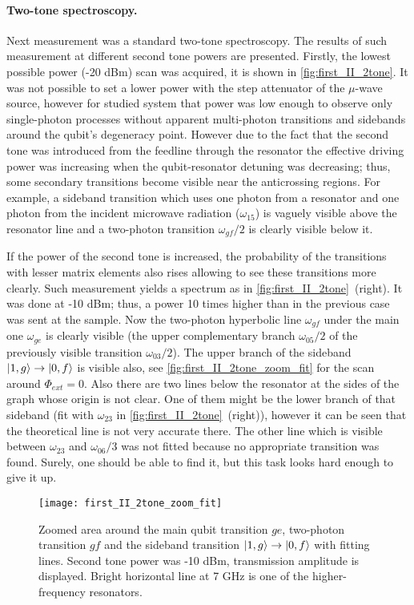 \documentclass[12pt, twoside]{report}
\DeclarePairedDelimiter\ket{\lvert}{\rangle}
\numberwithin{equation}{section}
\begin{document}
\paragraph{Two-tone spectroscopy.} Next measurement was a standard two-tone spectroscopy. The results of such measurement at different second tone powers are presented. Firstly, the lowest possible power (-20 dBm) scan was acquired, it is shown in \autoref{fig:first_II_2tone}. It was not possible to set a lower power with the step attenuator of the $\mu$-wave source, however for studied system that power was low enough to observe only single-photon processes without apparent multi-photon transitions and sidebands around the qubit's degeneracy point. However due to the fact that the second tone was introduced from the feedline through the resonator the effective driving power was increasing when the qubit-resonator detuning was decreasing; thus, some secondary transitions become visible near the anticrossing regions. For example, a sideband transition which uses one photon from a resonator and one photon from the incident microwave radiation ($\omega_{15}$) is vaguely visible above the resonator line and a two-photon transition $\omega_{gf}/2$ is clearly visible below it.

If the power of the second tone is increased, the probability of the transitions with lesser matrix elements also rises allowing to see these transitions more clearly. Such measurement yields a spectrum as in \autoref{fig:first_II_2tone}~(right). It was done at -10 dBm; thus, a power 10 times higher than in the previous case was sent at the sample. Now the two-photon hyperbolic line $\omega_{gf}$ under the main one $\omega_{ge}$ is clearly visible (the upper complementary branch $\omega_{05}/2$ of the previously visible transition $\omega_{03}/2$). The upper branch of the sideband $\ket{1,g}\rightarrow \ket{0,f}$ is visible also, see \autoref{fig:first_II_2tone_zoom_fit} for the scan around $\Phi_{ext}=0$. Also there are two lines below the resonator at the sides of the graph whose origin is not clear. One of them might be the lower branch of that sideband (fit with $\omega_{23}$ in \autoref{fig:first_II_2tone}~(right)), however it can be seen that the theoretical line is not very accurate there. The other line which is visible between $\omega_{23}$ and $\omega_{06}/3$ was not fitted because no appropriate transition was found. Surely, one should be able to find it, but this task looks hard enough to give it up.

	
\begin{figure}[t]
\centering
\texttt{[image: first\_II\_2tone\_zoom\_fit]}
\caption{Zoomed area around the main qubit transition $ge$, two-photon transition $gf$ and the sideband transition $\ket{1,g}\rightarrow \ket{0,f}$ with fitting lines. Second tone power was -10 dBm, transmission amplitude is displayed. Bright horizontal line at 7 GHz is one of the higher-frequency resonators.}
\label{fig:first_II_2tone_zoom_fit}
\end{figure}
\end{document}
